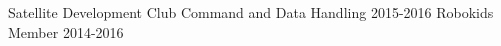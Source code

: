 \begin{cvhonors}
  \cvhonor
    {\hspace*{14pt}Satellite Development Club}
    {Command and Data Handling}
    {}
    {2015-2016}
  \cvhonor
    {\hspace*{14pt}Robokids}
    {Member}
    {}
    {2014-2016}

\end{cvhonors}